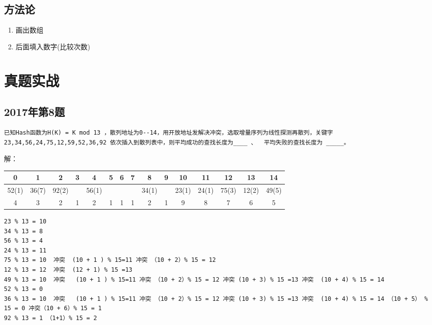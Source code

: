 \subsection{方法论}
\begin{enumerate}[noitemsep,topsep=0pt,parsep=0pt,partopsep=0pt]
	\item 画出数组
	\item 后面填入数字(比较次数)
\end{enumerate}

\section{真题实战}


\subsection{2017年第8题}


\begin{lstlisting}[basicstyle=\small\ttfamily, caption={2017年第8题}, numbers=none]
已知Hash函数为H(K) = K mod 13 ，散列地址为0--14，用开放地址发解决冲突，选取增量序列为线性探测再散列，关键字
23,34,56,24,75,12,59,52,36,92 依次插入到散列表中，则平均成功的查找长度为____ 、  平均失败的查找长度为 _____。
\end{lstlisting}


解：


\begin{tabular}{|c|c|c|c|c|c|c|c|c|c|c|c|c|c|c|}%
	\hline  %
	0 & 1 & 2 & 3 & 4 & 5 & 6 & 7 & 8 & 9 & 10 & 11 & 12 & 13 & 14 \\
	\hline  %
	52(1) & 36(7) & 92(2) &   & 56(1) &   &   &   & 34(1) &   & 23(1) & 24(1) & 75(3) & 12(2) & 49(5) \\
	\hline
	 4 & 3 & 2 &  1 & 2 & 1 &  1 &  1 & 2 & 1 & 9 & 8 & 7 & 6 &  5  \\
	\hline %
\end{tabular}




\begin{lstlisting}[basicstyle=\small\ttfamily, caption={}, numbers=none]
23 % 13 = 10
34 % 13 = 8   
56 % 13 = 4
24 % 13 = 11
75 % 13 = 10  冲突  (10 + 1 ) % 15=11 冲突 （10 + 2）% 15 = 12
12 % 13 = 12  冲突  (12 + 1) % 15 =13 
49 % 13 = 10  冲突   (10 + 1 ) % 15=11 冲突 （10 + 2）% 15 = 12 冲突 (10 + 3) % 15 =13 冲突  (10 + 4) % 15 = 14
52 % 13 = 0 
36 % 13 = 10  冲突   (10 + 1 ) % 15=11 冲突 （10 + 2）% 15 = 12 冲突 (10 + 3) % 15 =13 冲突  (10 + 4) % 15 = 14 （10 + 5） % 15 = 0 冲突（10 + 6）% 15 = 1 
92 % 13 = 1 （1+1）% 15 = 2
\end{lstlisting}

